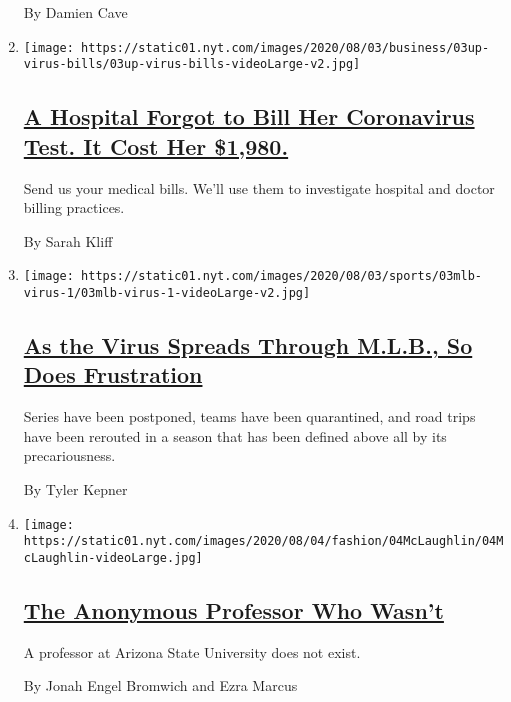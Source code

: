 \begin{enumerate}
  By Damien Cave
\item
  \texttt{[image: https://static01.nyt.com/images/2020/08/03/business/03up-virus-bills/03up-virus-bills-videoLarge-v2.jpg]}

  \hypertarget{a-hospital-forgot-to-bill-her-coronavirus-test-it-cost-her-1980}{%
  \subsection{\texorpdfstring{\href{/2020/08/03/upshot/nj-coronavirus-medical-bill.html}{A
  Hospital Forgot to Bill Her Coronavirus Test. It Cost Her
  \$1,980.}}{A Hospital Forgot to Bill Her Coronavirus Test. It Cost Her \$1,980.}}\label{a-hospital-forgot-to-bill-her-coronavirus-test-it-cost-her-1980}}

  Send us your medical bills. We'll use them to investigate hospital and
  doctor billing practices.

  By Sarah Kliff
\item
  \texttt{[image: https://static01.nyt.com/images/2020/08/03/sports/03mlb-virus-1/03mlb-virus-1-videoLarge-v2.jpg]}

  \hypertarget{as-the-virus-spreads-through-mlb-so-does-frustration}{%
  \subsection{\texorpdfstring{\href{/2020/08/03/sports/baseball/mlb-coronavirus-outbreak.html}{As
  the Virus Spreads Through M.L.B., So Does
  Frustration}}{As the Virus Spreads Through M.L.B., So Does Frustration}}\label{as-the-virus-spreads-through-mlb-so-does-frustration}}

  Series have been postponed, teams have been quarantined, and road
  trips have been rerouted in a season that has been defined above all
  by its precariousness.

  By Tyler Kepner
\item
  \texttt{[image: https://static01.nyt.com/images/2020/08/04/fashion/04McLaughlin/04McLaughlin-videoLarge.jpg]}

  \hypertarget{the-anonymous-professor-who-wasnt}{%
  \subsection{\texorpdfstring{\href{/2020/08/04/style/college-coronavirus-hoax.html}{The
  Anonymous Professor Who
  Wasn't}}{The Anonymous Professor Who Wasn't}}\label{the-anonymous-professor-who-wasnt}}

  A professor at Arizona State University does not exist.

  By Jonah Engel Bromwich and Ezra Marcus
\end{enumerate}

